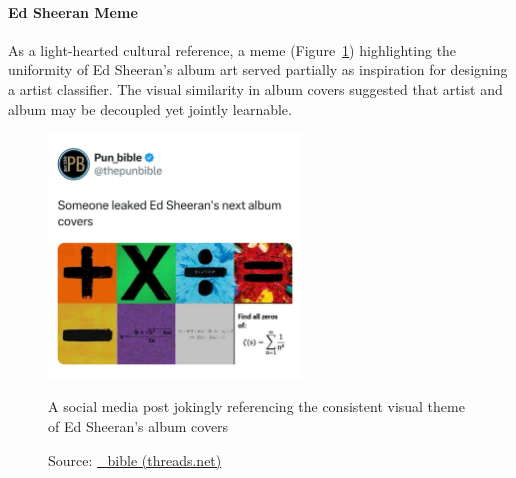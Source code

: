 \begin{uomappendix}
                \paragraph{Ed Sheeran Meme} As a light-hearted cultural reference, a meme (Figure~\ref{fig:EdMeme}) highlighting the uniformity of Ed Sheeran’s album art served partially as inspiration for designing a artist classifier. The visual similarity in album covers suggested that artist and album may be decoupled yet jointly learnable.
    
                \begin{figure}[h]
                    \centering
                    \includegraphics[width=0.6\textwidth]{images/EdSheeranMeme.jpg}
                    \caption{A social media post jokingly referencing the consistent visual theme of Ed Sheeran's album covers}
                    \label{fig:EdMeme}
                    \caption*{Source: \href{https://www.threads.net/@pun_bible/post/DB83pw3gZSh/media}{\@pun\_bible (threads.net)}}
                \end{figure}
        
    \end{uomappendix}
    
    
    